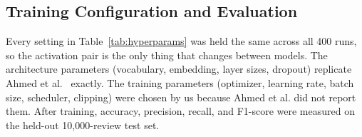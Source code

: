 \documentclass[conference]{IEEEtran}
\begin{document}
\subsection{Training Configuration and Evaluation}

Every setting in Table~\ref{tab:hyperparams} was held the
same across all 400 runs, so the activation pair is the only
thing that changes between models. The architecture parameters
(vocabulary, embedding, layer sizes, dropout) replicate
Ahmed et al.~\cite{ahmed2025} exactly. The training parameters
(optimizer, learning rate, batch size, scheduler, clipping)
were chosen by us because Ahmed et al. did not report them.
After training, accuracy, precision, recall, and F1-score were
measured on the held-out 10,000-review test set.

\begin{table}[htbp]
  \caption{Shared Hyperparameter Configuration}
  \label{tab:hyperparams}
  \centering\footnotesize
  \setlength{\tabcolsep}{3pt}
  \renewcommand{\arraystretch}{1.05}
\end{table}
\end{document}
